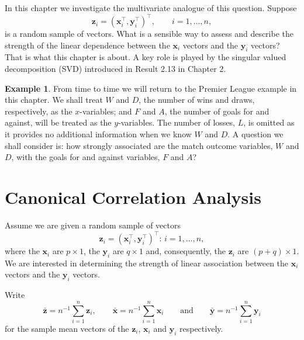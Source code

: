 \documentclass[]{book}
\theoremstyle{definition}
\theoremstyle{definition}
\newtheorem{example}{Example}[chapter]
\theoremstyle{definition}
\theoremstyle{remark}
\begin{document}
In this chapter we investigate the multivariate analogue of this question. Suppose
\[
\boldsymbol z_i =(\boldsymbol x_i^\top,\boldsymbol y_i^\top)^\top, \qquad i=1,\ldots, n,
\]
is a random sample of vectors. What is a sensible way to assess and describe the strength of the linear dependence between the \(\boldsymbol x_i\) vectors and the \(\boldsymbol y_i\) vectors? That is what this chapter is about. A key role is played by the singular valued decomposition (SVD) introduced in Result 2.13 in Chapter 2.

\begin{example}
\protect\hypertarget{exm:prem}{}{\label{exm:prem} }From time to time we will return to the Premier League example in this chapter. We shall treat \(W\) and \(D\), the number of wins and draws, respectively, as the \(x\)-variables; and \(F\) and \(A\), the number of goals for and against, will be treated as the \(y\)-variables. The number of losses, \(L\), is omitted as it provides no additional information when we know \(W\) and \(D\). A question we shall consider is: how strongly associated are the match outcome variables, \(W\) and \(D\), with the goals for and against variables, \(F\) and \(A\)?
\end{example}

\hypertarget{canonical-correlation-analysis}{%
\section{Canonical Correlation Analysis}\label{canonical-correlation-analysis}}

Assume we are given a random sample of vectors
\[
\boldsymbol z_i=(\boldsymbol x_i^\top , \boldsymbol y_i^\top )^\top: \, i=1,\ldots, n,
\]
where
the \(\boldsymbol x_i\) are \(p \times 1\), the \(\boldsymbol y_i\) are \(q \times 1\) and, consequently, the \(\boldsymbol z_i\) are \((p+q)\times 1\). We are interested in determining the strength of linear association between the \(\boldsymbol x_i\) vectors and the \(\boldsymbol y_i\) vectors.

Write
\[
\bar{\boldsymbol z}=n^{-1}\sum_{i=1}^n \boldsymbol z_i, \qquad \bar{\boldsymbol x}=n^{-1} \sum_{i=1}^n \boldsymbol x_i \qquad \text{and} \qquad \bar{\boldsymbol y}=n^{-1}\sum_{i=1}^n \boldsymbol y_i
\]
for the sample mean vectors of the \(\boldsymbol z_i\), \(\boldsymbol x_i\) and \(\boldsymbol y_i\) respectively.
\end{document}
